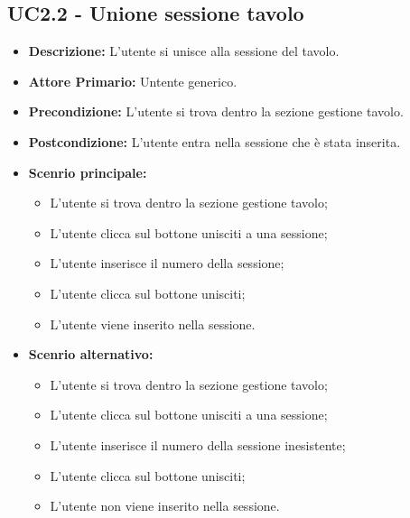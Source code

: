 \subsection{UC2.2 - Unione sessione tavolo}
\begin{itemize}
    \item \textbf{Descrizione:} L'utente si unisce alla sessione del tavolo.
    \item \textbf{Attore Primario:} Untente generico.
    \item \textbf{Precondizione:} L'utente si trova dentro la sezione gestione tavolo.
    \item \textbf{Postcondizione:} L'utente entra nella sessione che è stata inserita.
    \item \textbf{Scenrio principale:}
    \begin{itemize}
        \item L'utente si trova dentro la sezione gestione tavolo;
        \item L'utente clicca sul bottone unisciti a una sessione;
        \item L'utente inserisce il numero della sessione;
        \item L'utente clicca sul bottone unisciti;
        \item L'utente viene inserito nella sessione.
    \end{itemize}
    \item \textbf{Scenrio alternativo:}
    \begin{itemize}
        \item L'utente si trova dentro la sezione gestione tavolo;
        \item L'utente clicca sul bottone unisciti a una sessione;
        \item L'utente inserisce il numero della sessione inesistente;
        \item L'utente clicca sul bottone unisciti;
        \item L'utente non viene inserito nella sessione.
    \end{itemize}
\end{itemize}
